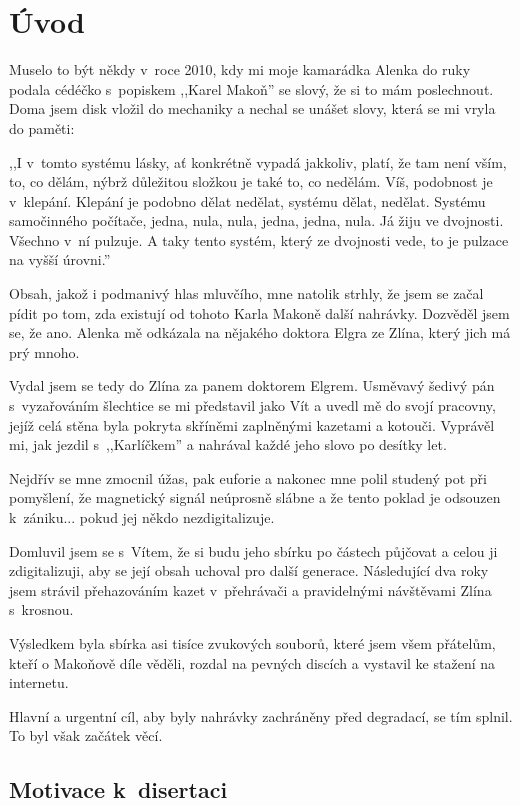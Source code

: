 \chapter{Úvod}
\label{kap:uvod}

Muselo to být někdy v~roce 2010, kdy mi moje kamarádka Alenka do ruky podala
cédéčko s~popiskem ,,Karel Makoň'' se slový, že si to mám poslechnout. Doma jsem
disk vložil do mechaniky a nechal se unášet slovy, která se mi vryla do paměti:

,,I v~tomto systému lásky, ať konkrétně vypadá jakkoliv, platí, že tam není
vším, to, co dělám, nýbrž důležitou složkou je také to, co nedělám. Víš,
podobnost je v~klepání. Klepání je podobno dělat nedělat, systému dělat,
nedělat. Systému samočinného počítače, jedna, nula, nula, jedna, jedna, nula. Já
žiju ve dvojnosti. Všechno v~ní pulzuje. A taky tento systém, který ze dvojnosti
vede, to je pulzace na vyšší úrovni.''

Obsah, jakož i podmanivý hlas mluvčího, mne natolik strhly, že jsem se začal
pídit po tom, zda existují od tohoto Karla Makoně další nahrávky. Dozvěděl jsem
se, že ano. Alenka mě odkázala na nějakého doktora Elgra ze Zlína, který jich má
prý mnoho.

Vydal jsem se tedy do Zlína za panem doktorem Elgrem. Usměvavý šedivý pán
s~vyzařováním šlechtice se mi představil jako Vít a uvedl mě do svojí pracovny, jejíž celá stěna byla
pokryta skříněmi zaplněnými kazetami a kotouči. Vyprávěl mi, jak jezdil
s~,,Karlíčkem'' a nahrával každé jeho slovo po desítky let.

Nejdřív se mne zmocnil úžas, pak euforie a nakonec mne polil studený pot při
pomyšlení, že magnetický signál neúprosně slábne a že tento poklad je odsouzen
k~zániku... pokud jej někdo nezdigitalizuje.

Domluvil jsem se s~Vítem, že si budu jeho sbírku po částech půjčovat a celou ji
zdigitalizuji, aby se její obsah uchoval pro další generace. Následující dva
roky jsem strávil přehazováním kazet v~přehrávači a pravidelnými návštěvami
Zlína s~krosnou.

Výsledkem byla sbírka asi tisíce zvukových souborů, které jsem všem přátelům,
kteří o Makoňově díle věděli, rozdal na pevných discích a vystavil ke stažení na
internetu.

Hlavní a urgentní cíl, aby byly nahrávky zachráněny před degradací, se tím
splnil. To byl však začátek věcí.

\section{Motivace k~disertaci}

